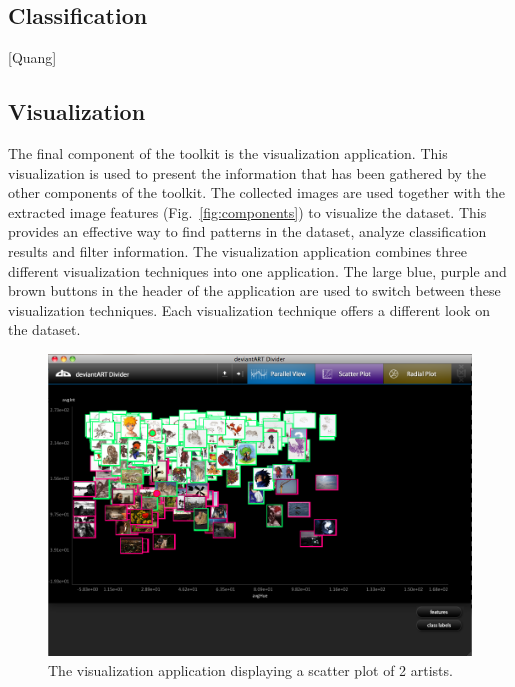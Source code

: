 \subsection{Classification}
[Quang]

\subsection{Visualization}
The final component of the toolkit is the visualization application.
This visualization is used to present the information that has been gathered by the other components of the toolkit.
The collected images are used together with the extracted image features (Fig.~\ref{fig:components}) to visualize the dataset.
This provides an effective way to find patterns in the dataset, analyze classification results and filter information.
The visualization application combines three different visualization techniques into one application.
The large blue, purple and brown buttons in the header of the application are used to switch between these visualization techniques.
Each visualization technique offers a different look on the dataset.

\begin{figure}[htb]
  \centering
  \includegraphics[width=1\linewidth]{img/visualization_scatter.png}
  \caption{The visualization application displaying a scatter plot of 2 artists.}
  \label{fig:visualization_scatter}
\end{figure}

